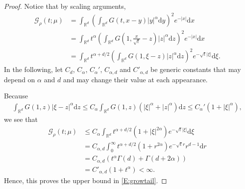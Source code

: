 \documentclass[12pt]{report}
\theoremstyle{plain}
\theoremstyle{definition}
\numberwithin{equation}{section}
\newcommand{\R}{\mathbb{R}}
\newcommand{\ud}{\ensuremath{ \mathrm{d} }}
\begin{document}
\begin{proof}
	Notice that by scaling arguments,
	\begin{align*}
	\mathcal{G}_\rho(t;\mu)
	& = \int_{\R^d} \left(\int_{\R^d}G(t,x-y) |y|^\alpha \ud y\right)^2 e^{-|x|} \ud x                                        \\
	& = \int_{\R^d}t^\alpha \left(\int_{\R^d}G\left(1,\frac{x}{\sqrt{t}}-z\right) |z|^\alpha \ud z\right)^2 e^{-|x|} \ud x    \\
	& = \int_{\R^d}t^{\alpha+d/2} \left(\int_{\R^d}G\left(1,\xi-z\right) |z|^\alpha \ud z\right)^2 e^{-\sqrt{t}|\xi|} \ud \xi.
	\end{align*}
	In the following, let $C_d$, $C_\alpha$, $C_\alpha'$, $C_{\alpha, d}$ and $C'_{\alpha, d}$ be generic constants that may depend on
	$\alpha $ and $d$ and may change their value at each appearance. \bigskip
	
	 Because
	\begin{align*}
	\int_{\R^d}G\left(1,z\right) |\xi-z|^\alpha \ud z
	\le C_\alpha \int_{\R^d}G\left(1,z\right) \left(|\xi|^\alpha + |z|^\alpha\right) \ud z
	\le C_\alpha' \left( 1+|\xi|^\alpha\right),
	\end{align*}
	we see that
	\begin{align*}
	\mathcal{G}_\rho(t;\mu)
	& \le C_\alpha \int_{\R^d}t^{\alpha+d/2} \left(1+|\xi|^{2\alpha}\right) e^{-\sqrt{t}|\xi|} \ud \xi \\
	& = C_{\alpha, d}\int_{0}^{\infty}t^{\alpha+d/2} \left(1+r^{2\alpha}\right) e^{-\sqrt{t}r}r^{d-1} \ud r        \\
	& = C_{\alpha, d} \left(t^\alpha \Gamma(d) + \Gamma(d+2\alpha)\right)                                   \\
	& = C'_{\alpha, d} (1+ t^\alpha)<\infty.
	\end{align*}
	Hence, this proves the upper bound in \eqref{E:growtail}. \bigskip
	

\end{proof}
\end{document}
